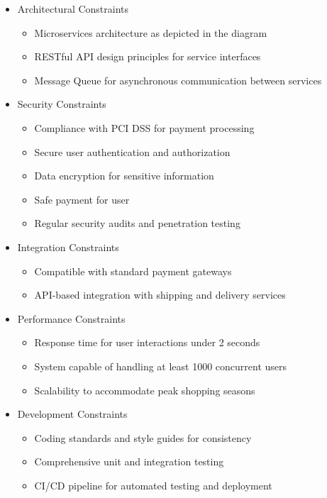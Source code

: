 \documentclass[oneside,a4paper,12pt,explicit]{book}
\begin{document}
\begin{itemize}
    \item Architectural Constraints
    \begin{itemize}
        \item Microservices architecture as depicted in the diagram
        \item RESTful API design principles for service interfaces
        \item Message Queue for asynchronous communication between services
    \end{itemize}
    
    \item Security Constraints
    \begin{itemize}
        \item Compliance with PCI DSS for payment processing
        \item Secure user authentication and authorization
        \item Data encryption for sensitive information
        \item Safe payment for user
        \item Regular security audits and penetration testing
    \end{itemize}
    
    \item Integration Constraints
    \begin{itemize}
        \item Compatible with standard payment gateways
        \item API-based integration with shipping and delivery services
    \end{itemize}
    
    \item Performance Constraints
    \begin{itemize}
        \item Response time for user interactions under 2 seconds
        \item System capable of handling at least 1000 concurrent users
        \item Scalability to accommodate peak shopping seasons
    \end{itemize}
    
    \item Development Constraints
    \begin{itemize}
        \item Coding standards and style guides for consistency
        \item Comprehensive unit and integration testing
        \item CI/CD pipeline for automated testing and deployment
    \end{itemize}
\end{itemize}
\end{document}
